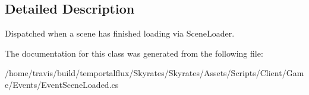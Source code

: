 \subsection{Detailed Description}
Dispatched when a scene has finished loading via Scene\-Loader. 



The documentation for this class was generated from the following file\-:\begin{DoxyCompactItemize}
\item 
/home/travis/build/temportalflux/\-Skyrates/\-Skyrates/\-Assets/\-Scripts/\-Client/\-Game/\-Events/Event\-Scene\-Loaded.\-cs\end{DoxyCompactItemize}
